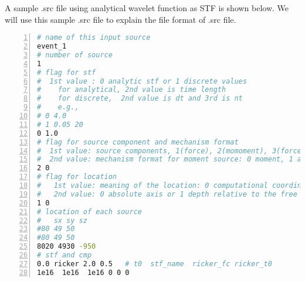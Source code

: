 A sample .src file using analytical wavelet function as STF is shown below.
 We will use this sample .src file to explain the file format of .src file.
\begin{lstlisting}[language=bash, caption=Source input file using analytical wavelet,
   numbers=left, numbersep=5pt,numberstyle=\tiny\color{codegray}, commentstyle=\color{codegreen},
   frame=tb]
# name of this input source
event_1
# number of source
1
# flag for stf
#  1st value : 0 analytic stf or 1 discrete values
#    for analytical, 2nd value is time length
#    for discrete,  2nd value is dt and 3rd is nt
#    e.g.,
# 0 4.0 
# 1 0.05 20
0 1.0
# flag for source component and mechanism format
#  1st value: source components, 1(force), 2(momoment), 3(force+moment)
#  2nd value: mechanism format for moment source: 0 moment, 1 angle + mu + D + A
2 0
# flag for location
#   1st value: meaning of the location: 0 computational coordinate, 1 physical coordinate
#   2nd value: 0 absolute axis or 1 depth relative to the free surface of the third coordinate
1 0
# location of each source
#   sx sy sz
#80 49 50
#80 49 50
8020 4930 -950
# stf and cmp
0.0 ricker 2.0 0.5   # t0  stf_name  ricker_fc ricker_t0
1e16  1e16  1e16 0 0 0 
\end{lstlisting}


